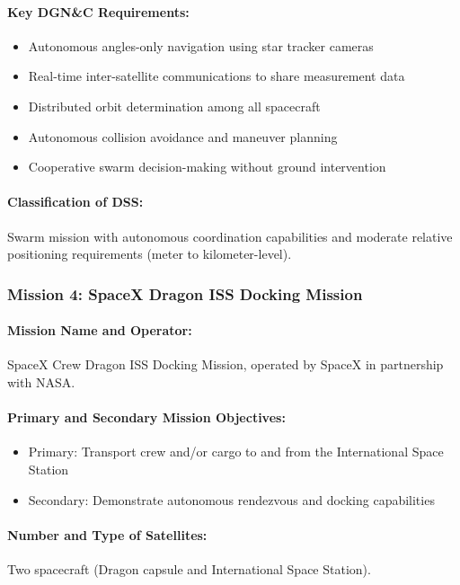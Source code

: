 \paragraph{Key DGN\&C Requirements:}
\begin{itemize}
    \item Autonomous angles-only navigation using star tracker cameras
    \item Real-time inter-satellite communications to share measurement data
    \item Distributed orbit determination among all spacecraft
    \item Autonomous collision avoidance and maneuver planning
    \item Cooperative swarm decision-making without ground intervention
\end{itemize}

\paragraph{Classification of DSS:}
Swarm mission with autonomous coordination capabilities and moderate relative positioning requirements (meter to kilometer-level).

\subsubsection{Mission 4: SpaceX Dragon ISS Docking Mission}

\paragraph{Mission Name and Operator:} 
SpaceX Crew Dragon ISS Docking Mission, operated by SpaceX in partnership with NASA.

\paragraph{Primary and Secondary Mission Objectives:}
\begin{itemize}
    \item Primary: Transport crew and/or cargo to and from the International Space Station
    \item Secondary: Demonstrate autonomous rendezvous and docking capabilities
\end{itemize}

\paragraph{Number and Type of Satellites:} 
Two spacecraft (Dragon capsule and International Space Station).

